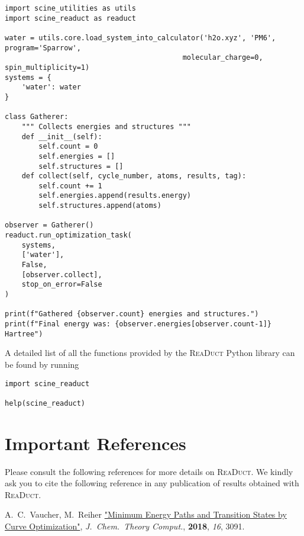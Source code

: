 \documentclass[]{tufte-book}
\begin{document}
\begin{verbatim}
import scine_utilities as utils
import scine_readuct as readuct

water = utils.core.load_system_into_calculator('h2o.xyz', 'PM6', program='Sparrow',
                                          molecular_charge=0, spin_multiplicity=1)
systems = {
    'water': water
}

class Gatherer:
    """ Collects energies and structures """
    def __init__(self):
        self.count = 0
        self.energies = []
        self.structures = []
    def collect(self, cycle_number, atoms, results, tag):
        self.count += 1
        self.energies.append(results.energy)
        self.structures.append(atoms)

observer = Gatherer()
readuct.run_optimization_task(
    systems,
    ['water'],
    False,
    [observer.collect],
    stop_on_error=False
)

print(f"Gathered {observer.count} energies and structures.")
print(f"Final energy was: {observer.energies[observer.count-1]} Hartree")
\end{verbatim}



A detailed list of all the functions provided by the \textsc{ReaDuct} Python library can be found by running
\begin{verbatim}
import scine_readuct

help(scine_readuct)
\end{verbatim}



\chapter{Important References}

Please consult the following references for more details on \textsc{ReaDuct}.
We kindly ask you to cite the following reference in any publication of results obtained with \textsc{ReaDuct}.
\vspace{1.0cm}

A.~C.~Vaucher, M.~Reiher \href{https://pubs.acs.org/doi/10.1021/acs.jctc.8b00169}{"Minimum Energy Paths and Transition States by Curve Optimization"}, \textit{J.~Chem.~Theory Comput.}, \textbf{2018}, \textit{16}, 3091.




\backmatter




\end{document}
